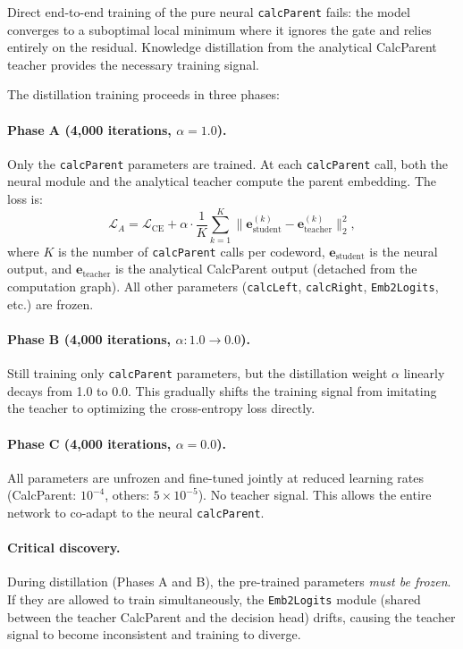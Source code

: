 \documentclass[11pt,a4paper]{article}
\begin{document}
Direct end-to-end training of the pure neural \texttt{calcParent} fails: the model converges to a suboptimal local minimum where it ignores the gate and relies entirely on the residual. Knowledge distillation from the analytical CalcParent teacher provides the necessary training signal.

The distillation training proceeds in three phases:

\paragraph{Phase A (4,000 iterations, $\alpha = 1.0$).} Only the \texttt{calcParent} parameters are trained. At each \texttt{calcParent} call, both the neural module and the analytical teacher compute the parent embedding. The loss is:
\begin{equation}
    \mathcal{L}_A = \mathcal{L}_{\text{CE}} + \alpha \cdot \frac{1}{K} \sum_{k=1}^{K} \| \bm{e}_{\text{student}}^{(k)} - \bm{e}_{\text{teacher}}^{(k)} \|_2^2,
\end{equation}
where $K$ is the number of \texttt{calcParent} calls per codeword, $\bm{e}_{\text{student}}$ is the neural output, and $\bm{e}_{\text{teacher}}$ is the analytical CalcParent output (detached from the computation graph). All other parameters (\texttt{calcLeft}, \texttt{calcRight}, \texttt{Emb2Logits}, etc.) are frozen.

\paragraph{Phase B (4,000 iterations, $\alpha: 1.0 \to 0.0$).} Still training only \texttt{calcParent} parameters, but the distillation weight $\alpha$ linearly decays from 1.0 to 0.0. This gradually shifts the training signal from imitating the teacher to optimizing the cross-entropy loss directly.

\paragraph{Phase C (4,000 iterations, $\alpha = 0.0$).} All parameters are unfrozen and fine-tuned jointly at reduced learning rates (CalcParent: $10^{-4}$, others: $5 \times 10^{-5}$). No teacher signal. This allows the entire network to co-adapt to the neural \texttt{calcParent}.

\paragraph{Critical discovery.} During distillation (Phases A and B), the pre-trained parameters \emph{must be frozen}. If they are allowed to train simultaneously, the \texttt{Emb2Logits} module (shared between the teacher CalcParent and the decision head) drifts, causing the teacher signal to become inconsistent and training to diverge.
\end{document}
